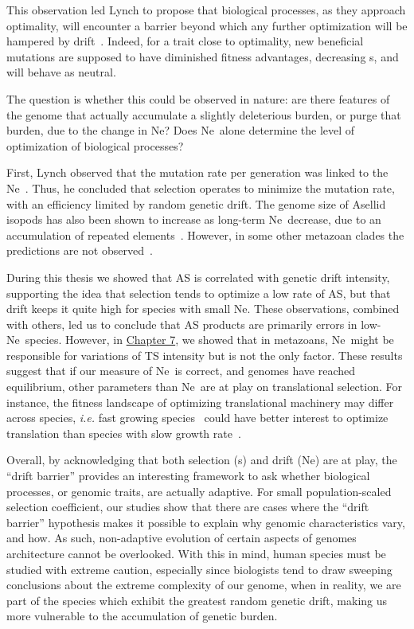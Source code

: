 This observation led Lynch to propose that biological processes, as they approach optimality, will encounter a barrier beyond which any further optimization will be hampered by drift~\citep{lynch_genetic_2016}. Indeed, for a trait close to optimality, new beneficial mutations are supposed to have diminished fitness advantages, decreasing \acrshort{s}, and will behave as neutral.

The question is whether this could be observed in nature: are there features of the genome that actually accumulate a slightly deleterious burden, or purge that burden, due to the change in \acrshort{Ne}? Does \acrshort{Ne}~alone determine the level of optimization of biological processes?

First, Lynch observed that the mutation rate per generation was linked to the \acrshort{Ne}~\citep{lynch_evolution_2010, sung_drift-barrier_2012, bergeron_evolution_2023}. Thus, he concluded that selection operates to minimize the mutation rate, with an efficiency limited by random  \gls{genetic drift}. The genome size of Asellid isopods has also been shown to increase as long-term \acrshort{Ne}~decrease, due to an accumulation of repeated elements~\citep{lefebure_less_2017}. However, in some other metazoan clades the predictions are not observed~\citep{whitney_did_2010, roddy_mammals_2021, marino_effective_2024}.

During this thesis we showed that \acrshort{AS} is correlated with  \gls{genetic drift} intensity, supporting the idea that selection tends to optimize a low rate of AS, but that drift keeps it quite high for species with small \acrshort{Ne}. These observations, combined with others, led us to conclude that \acrshort{AS} products are primarily errors in low-\acrshort{Ne}~species. However, in \hyperref[chap:CodonUsage]{Chapter 7}, we showed that in metazoans, \acrshort{Ne}~might be responsible for variations of \acrshort{TS} intensity but is not the only factor. These results suggest that if our measure of \acrshort{Ne}~is correct, and genomes have reached equilibrium, other parameters than \acrshort{Ne}~are at play on translational selection. For instance, the fitness landscape of optimizing translational machinery may differ across species, \textit{i.e.} fast growing species~\citep{manthey_rapid_2024} could have better interest to optimize translation than species with slow growth rate~\citep{rocha_codon_2004}.

Overall, by acknowledging that both selection (\acrshort{s}) and drift (\acrshort{Ne}) are at play, the “drift barrier” provides an interesting framework to ask whether biological processes, or genomic traits, are actually adaptive. For small population-scaled selection coefficient, our studies show that there are cases where the “drift barrier” hypothesis makes it possible to explain why genomic characteristics vary, and how. As such, non-adaptive evolution of certain aspects of genomes architecture cannot be overlooked. With this in mind, human species must be studied with extreme caution, especially since biologists tend to draw sweeping conclusions about the extreme complexity of our genome, when in reality, we are part of the species which exhibit the greatest random  \gls{genetic drift}, making us more vulnerable to the accumulation of genetic burden.


